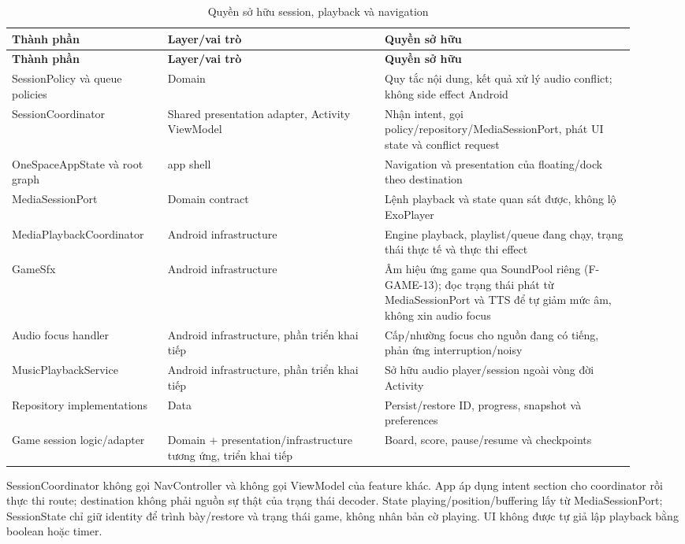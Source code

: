 \begingroup
\small
\renewcommand{\arraystretch}{1.2}
\setlength{\tabcolsep}{3pt}
\begin{longtable}{>{\RaggedRight\arraybackslash}p{0.23\linewidth}>{\RaggedRight\arraybackslash}p{0.32\linewidth}>{\RaggedRight\arraybackslash}p{0.37\linewidth}}
\caption{Quyền sở hữu session, playback và navigation}
\label{tab:coordinators}\\
\toprule
\textbf{Thành phần} & \textbf{Layer/vai trò} & \textbf{Quyền sở hữu} \\
\midrule
\endfirsthead
\toprule
\textbf{Thành phần} & \textbf{Layer/vai trò} & \textbf{Quyền sở hữu} \\
\midrule
\endhead
\bottomrule
\endfoot
SessionPolicy và queue policies & Domain & Quy tắc nội dung, kết quả xử lý audio conflict; không side effect Android \\
SessionCoordinator & Shared presentation adapter, Activity ViewModel & Nhận intent, gọi policy/repository/MediaSessionPort, phát UI state và conflict request \\
OneSpaceAppState và root graph & app shell & Navigation và presentation của floating/dock theo destination \\
MediaSessionPort & Domain contract & Lệnh playback và state quan sát được, không lộ ExoPlayer \\
MediaPlayback\-Coordinator & Android infrastructure & Engine playback, playlist/queue đang chạy, trạng thái thực tế và thực thi effect \\
GameSfx & Android infrastructure & Âm hiệu ứng game qua SoundPool riêng (F-GAME-13); đọc trạng thái phát từ MediaSessionPort và TTS để tự giảm mức âm, không xin audio focus \\
Audio focus handler & Android infrastructure, phần triển khai tiếp & Cấp/nhường focus cho nguồn đang có tiếng, phản ứng interruption/noisy \\
MusicPlaybackService & Android infrastructure, phần triển khai tiếp & Sở hữu audio player/session ngoài vòng đời Activity \\
Repository implementations & Data & Persist/restore ID, progress, snapshot và preferences \\
Game session logic/adapter & Domain + presentation/infrastructure tương ứng, triển khai tiếp & Board, score, pause/resume và checkpoints \\
\end{longtable}
\endgroup

SessionCoordinator không gọi NavController và không gọi ViewModel của feature khác. App áp dụng intent section cho coordinator rồi thực thi route; destination không phải nguồn sự thật của trạng thái decoder. State playing/position/buffering lấy từ MediaSessionPort; SessionState chỉ giữ identity để trình bày/restore và trạng thái game, không nhân bản cờ playing. UI không được tự giả lập playback bằng boolean hoặc timer.

